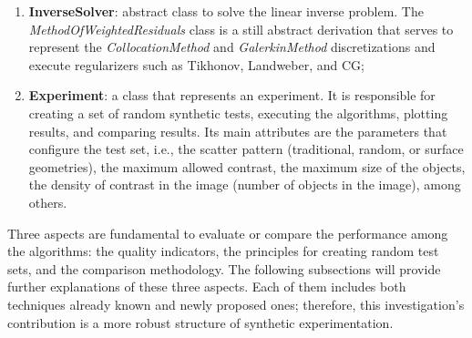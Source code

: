 \begin{enumerate}
				\item\textbf{InverseSolver}: abstract class to solve the linear inverse problem. The \textit{MethodOfWeightedResiduals} class is a still abstract derivation that serves to represent the \textit{CollocationMethod} and \textit{GalerkinMethod} discretizations and execute regularizers such as Tikhonov, Landweber, and CG;
				\item\textbf{Experiment}: a class that represents an experiment. It is responsible for creating a set of random synthetic tests, executing the algorithms, plotting results, and comparing results. Its main attributes are the parameters that configure the test set, i.e., the scatter pattern (traditional, random, or surface geometries), the maximum allowed contrast, the maximum size of the objects, the density of contrast in the image (number of objects in the image), among others.
			\end{enumerate}
			Three aspects are fundamental to evaluate or compare the performance among the algorithms: the quality indicators, the principles for creating random test sets, and the comparison methodology. The following subsections will provide further explanations of these three aspects. Each of them includes both techniques already known and newly proposed ones; therefore, this investigation's contribution is a more robust structure of synthetic experimentation.
			
